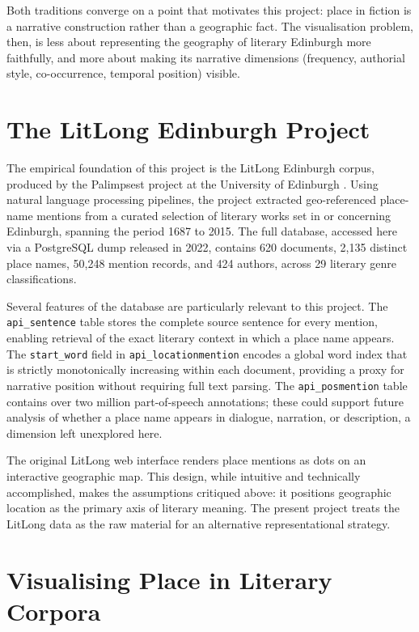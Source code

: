\documentclass[logo,msc]{infthesis}
\begin{document}
Both traditions converge on a point that motivates this project: place in fiction is a narrative construction rather than a geographic fact. The visualisation problem, then, is less about representing the geography of literary Edinburgh more faithfully, and more about making its narrative dimensions (frequency, authorial style, co-occurrence, temporal position) visible.
 
\section{The LitLong Edinburgh Project}
 
The empirical foundation of this project is the LitLong Edinburgh corpus, produced by the Palimpsest project at the University of Edinburgh \cite{anderson2016}. Using natural language processing pipelines, the project extracted geo-referenced place-name mentions from a curated selection of literary works set in or concerning Edinburgh, spanning the period 1687 to 2015. The full database, accessed here via a PostgreSQL dump released in 2022, contains 620 documents, 2,135 distinct place names, 50,248 mention records, and 424 authors, across 29 literary genre classifications.
 
Several features of the database are particularly relevant to this project. The \texttt{api\_sentence} table stores the complete source sentence for every mention, enabling retrieval of the exact literary context in which a place name appears. The \texttt{start\_word} field in \texttt{api\_locationmention} encodes a global word index that is strictly monotonically increasing within each document, providing a proxy for narrative position without requiring full text parsing. The \texttt{api\_posmention} table contains over two million part-of-speech annotations; these could support future analysis of whether a place name appears in dialogue, narration, or description, a dimension left unexplored here.
 
The original LitLong web interface renders place mentions as dots on an interactive geographic map. This design, while intuitive and technically accomplished, makes the assumptions critiqued above: it positions geographic location as the primary axis of literary meaning. The present project treats the LitLong data as the raw material for an alternative representational strategy.
 
\section{Visualising Place in Literary Corpora}
 
\end{document}
